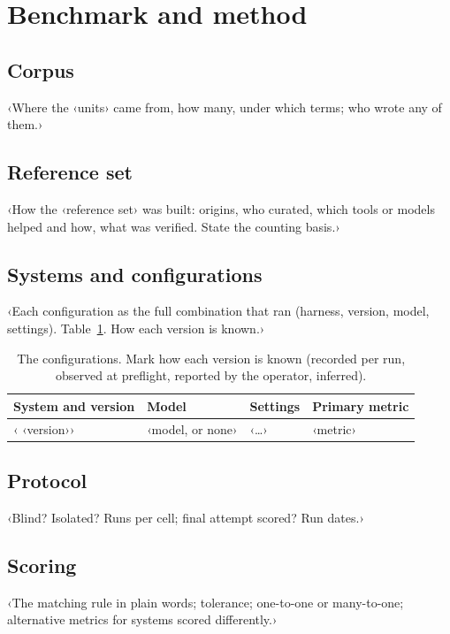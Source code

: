 \section{Benchmark and method}
\label{sec:method}

\subsection{Corpus}
\label{sec:corpus}
‹Where the ‹units› came from, how many, under which terms; who wrote any of them.›

\subsection{Reference set}
\label{sec:reference}
‹How the ‹reference set› was built: origins, who curated, which tools or models helped and how, what was verified. State the counting basis.›

\subsection{Systems and configurations}
\label{sec:configs}
‹Each configuration as the full combination that ran (harness, version, model, settings). Table~\ref{tab:configs}. How each version is known.›

\begin{table}[H]
\centering
\small
\caption{The configurations. Mark how each version is known (recorded per run, observed at preflight, reported by the operator, inferred).}
\label{tab:configs}
\begin{tabularx}{\textwidth}{>{\raggedright\arraybackslash}p{3.6cm}>{\raggedright\arraybackslash}p{2.2cm}>{\raggedright\arraybackslash}X>{\raggedright\arraybackslash}p{2.2cm}}
\toprule
System and version & Model & Settings & Primary metric \\
\midrule
‹{} ‹version››& ‹model, or none› & ‹…› & ‹metric› \\
\bottomrule
\end{tabularx}
\end{table}

\subsection{Protocol}
\label{sec:protocol}
‹Blind? Isolated? Runs per cell; final attempt scored? Run dates.›

\subsection{Scoring}
\label{sec:scoring}
‹The matching rule in plain words; tolerance; one-to-one or many-to-one; alternative metrics for systems scored differently.›

